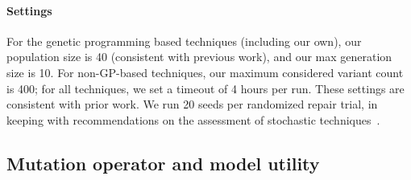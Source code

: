 \documentclass[conference]{IEEEtran}
\begin{document}
\paragraph{Settings} For the genetic programming based techniques (including our own), our population
size is 40 (consistent with previous work), and our max generation size is 10.
For non-GP-based techniques, our maximum considered variant count is 400; for
all techniques, we set a timeout of 4 hours per run.  These settings are
consistent with prior work.  We run 20 seeds per randomized repair trial, in
keeping with recommendations on the assessment of stochastic
techniques~\cite{arcuri11}.

\subsection{Mutation operator and model utility} \label{sec:oputil}


\newcommand\mII[1]{\multicolumn{2}{c|}{#1}}
\end{document}
